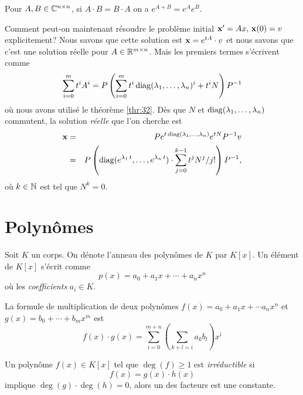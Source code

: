 \begin{lemma}
  \label{lem:18}
  Pour $A,B \in \mathbb{C}^{n \times n}$, si $A\cdot B = B \cdot A$ on a $e^{A+B} = e^A e^B$. 
\end{lemma}



Comment peut-on maintenant résoudre le problème initial $\mathbf{x}' = Ax, \, \mathbf{x}(0) = v$ explicitement? Nous savons que cette solution est $\mathbf{x} = e^{tA} \cdot v$ et nous savons que c'est une solution réelle pour $A \in \mathbb{R}^{m \times n}$. Mais les premiers termes s'écrivent comme 
\begin{displaymath}
  \sum_{i=0}^m t^i A^i = P \left(\sum_{i=0}^m t^i \operatorname{diag}(\lambda_1,\dots,\lambda_n)^i + t^i N \right) P^{-1} 
\end{displaymath}
où nous avons utilisé le théorème \ref{thr:32}. Dès que $N$ et $\operatorname{diag}(\lambda_1,\dots,\lambda_n)$ commutent, la solution \emph{réelle} que l'on cherche est  
\begin{eqnarray*}
  \mathbf{x} & = &  P e^{t\operatorname{diag}(\lambda_1,\dots,\lambda_n)} e^{tN} P^{-1} v \\
     & = & P \left( \operatorname{diag}(e^{\lambda_1 \, t},\dots,e^{\lambda_n \, t})\cdot  \sum_{j=0}^{k-1} t^j N^{j} / j!\right)P^{-1},
\end{eqnarray*}
où $k \in \mathbb{N}$ est tel que $N^k = 0$. 

\section{Polynômes}
\label{sec:polyn-les-lalg}

Soit $K$ un corps. 
On dénote l'anneau des polynômes de $K$ par $K[x]$. 
Un élément de $K[x]$ s'écrit comme 
\begin{displaymath}
  p(x) = a_0 + a_1 x + \cdots + a_n x^n 
\end{displaymath}
où les \emph{coefficients} $a_i \in K$. 

La formule de multiplication de deux polynômes $f(x) = a_0+a_1x+ \cdots a_n x^n$ et $g(x) = b_0 + \cdots + b_m x^m$  est 
\begin{equation}
\label{eq:21}
  f(x) \cdot g(x) = \sum_{i = 0}^{m+n} \left(\sum_{k+l = i}  a_{k} b_l\right) x^i
\end{equation}


\begin{definition}
  \label{def:30}
  Un polynôme $f(x) \in K[x]$
  tel que $\deg(f) \geq 1$ est \emph{irréductible} si
  \begin{displaymath}
    f(x) = g(x) \cdot h(x) 
  \end{displaymath}
implique $\deg(g) \cdot \deg(h) = 0$, alors un des facteurs est une constante. 
\end{definition}




